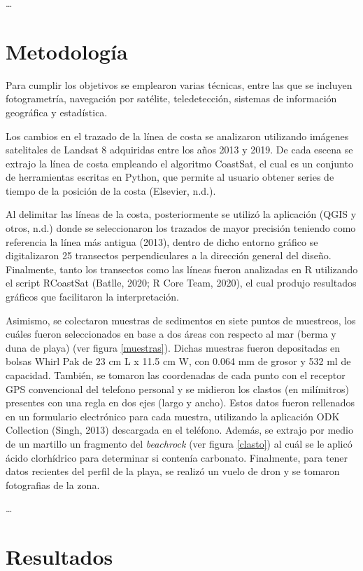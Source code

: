 \documentclass[11pt,]{article}
\begin{document}
\ldots

\section{Metodología}\label{metodologuxeda}

Para cumplir los objetivos se emplearon varias técnicas, entre las que
se incluyen fotogrametría, navegación por satélite, teledetección,
sistemas de información geográfica y estadística.

Los cambios en el trazado de la línea de costa se analizaron utilizando
imágenes satelitales de Landsat 8 adquiridas entre los años 2013 y 2019.
De cada escena se extrajo la línea de costa empleando el algoritmo
CoastSat, el cual es un conjunto de herramientas escritas en Python, que
permite al usuario obtener series de tiempo de la posición de la costa
(Elsevier, n.d.).

Al delimitar las líneas de la costa, posteriormente se utilizó la
aplicación (QGIS y otros, n.d.) donde se seleccionaron los trazados de
mayor precisión teniendo como referencia la línea más antigua (2013),
dentro de dicho entorno gráfico se digitalizaron 25 transectos
perpendiculares a la dirección general del diseño. Finalmente, tanto los
transectos como las líneas fueron analizadas en R utilizando el script
RCoastSat (Batlle, 2020; R Core Team, 2020), el cual produjo resultados
gráficos que facilitaron la interpretación.

Asimismo, se colectaron muestras de sedimentos en siete puntos de
muestreos, los cuáles fueron seleccionados en base a dos áreas con
respecto al mar (berma y duna de playa) (ver figura \ref{muestras}).
Dichas muestras fueron depositadas en bolsas Whirl Pak de 23 cm L x 11.5
cm W, con 0.064 mm de grosor y 532 ml de capacidad. También, se tomaron
las coordenadas de cada punto con el receptor GPS convencional del
telefono personal y se midieron los clastos (en milímitros) presentes
con una regla en dos ejes (largo y ancho). Estos datos fueron rellenados
en un formulario electrónico para cada muestra, utilizando la aplicación
ODK Collection (Singh, 2013) descargada en el teléfono. Además, se
extrajo por medio de un martillo un fragmento del \emph{beachrock} (ver
figura \ref{clasto}) al cuál se le aplicó ácido clorhídrico para
determinar si contenía carbonato. Finalmente, para tener datos recientes
del perfil de la playa, se realizó un vuelo de dron y se tomaron
fotografias de la zona.

\ldots

\section{Resultados}\label{resultados}
\end{document}
